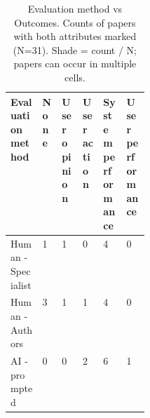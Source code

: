 \begin{table}[!htbp]
\centering
\small
\setlength{\tabcolsep}{4pt}
\renewcommand{\arraystretch}{1.3}
\caption{Evaluation method vs Outcomes. Counts of papers with both attributes marked (N=31). Shade = count / N; papers can occur in multiple cells.}
\begin{tabularx}{\linewidth}{|>{\raggedright\arraybackslash}p{0.23\linewidth}|>{\centering\arraybackslash}X|>{\centering\arraybackslash}X|>{\centering\arraybackslash}X|>{\centering\arraybackslash}X|>{\centering\arraybackslash}X|}
\hline
\textbf{Evaluation method} & \textbf{\hspace{0pt}None} & \textbf{\hspace{0pt}User opinion} & \textbf{\hspace{0pt}User action} & \textbf{\hspace{0pt}System performance} & \textbf{\hspace{0pt}User performance} \\ \hline
Human - Specialist & \cellcolor{purple!3}1 & \cellcolor{purple!3}1 & \cellcolor{purple!0}0 & \cellcolor{purple!13}4 & \cellcolor{purple!0}0 \\ \hline
Human - Authors & \cellcolor{purple!10}3 & \cellcolor{purple!3}1 & \cellcolor{purple!3}1 & \cellcolor{purple!13}4 & \cellcolor{purple!0}0 \\ \hline
AI - prompted & \cellcolor{purple!0}0 & \cellcolor{purple!0}0 & \cellcolor{purple!6}2 & \cellcolor{purple!19}6 & \cellcolor{purple!3}1 \\ \hline
\end{tabularx}
\end{table}
